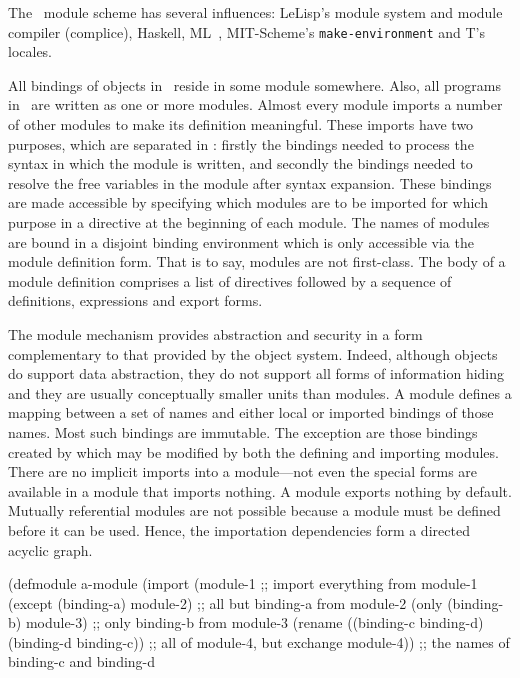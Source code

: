 %
\label{sec:modules}
%
\begin{optDefinition}
The \eulisp\ module scheme has several influences:
LeLisp's module system and module compiler (complice),
Haskell, ML~, MIT-Scheme's {\tt make-environment} and T's locales.

All bindings of objects in \eulisp\ reside in some module somewhere.  Also, all
programs in \eulisp\ are written as one or more modules.  Almost every module
imports a number of other modules to make its definition meaningful.  These
imports have two purposes, which are separated in \eulisp: firstly the bindings
needed to process the syntax in which the module is written, and secondly the
bindings needed to resolve the free variables in the module after syntax
expansion.  These bindings are made accessible by specifying which modules are
to be imported for which purpose in a directive at the beginning of each module.
The names of modules are bound in a disjoint binding
environment which is only accessible via the module definition form.  That
is to say, modules are not first-class.  The body of a module definition
comprises a list of directives followed by a sequence of definitions,
expressions and export forms.

The module mechanism provides abstraction and security in a form complementary
to that provided by the object system.  Indeed, although objects do support data
abstraction, they do not support all forms of information hiding and they are
usually conceptually smaller units than modules.  A module defines a mapping
between a set of names and either local or imported bindings of those names.
Most such bindings are immutable.  The exception are those bindings created by
 which may be modified by both the defining and importing
modules.  There are no implicit imports into a module---not even the special
forms are available in a module that imports nothing.  A module exports nothing
by default.  Mutually referential modules are not possible because a module must
be defined before it can be used.  Hence, the importation dependencies form a
directed acyclic graph.
%
\begin{figure*}[t]
\begin{example}
\label{example:module}
\begin{center}
\begin{minipage}[t]{\textwidth}{
\syntax
(defmodule a-module
  (import
    (module-1                                        ;; import everything from module-1
     (except (binding-a) module-2)                   ;; all but binding-a from module-2
     (only (binding-b) module-3)                     ;; only binding-b from module-3
     (rename
      ((binding-c binding-d) (binding-d binding-c))  ;; all of module-4, but exchange
      module-4))                                     ;; the names of binding-c and binding-d

}
\end{minipage}
\end{center}
\end{example}
\end{figure*}
\end{optDefinition}
